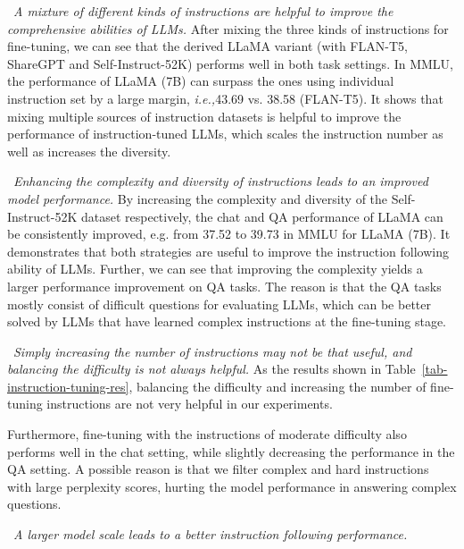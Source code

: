\textbullet~\emph{A mixture of different kinds of instructions are helpful to improve the comprehensive abilities of LLMs.} After mixing the three kinds of instructions for fine-tuning, we can see that the derived LLaMA variant (with FLAN-T5, ShareGPT and Self-Instruct-52K) performs well in both task settings. In MMLU, the performance of LLaMA (7B) can surpass the ones using individual instruction set by a large margin, \emph{i.e.,}43.69 vs. 38.58 (FLAN-T5). It shows that mixing multiple sources of instruction datasets is  helpful to improve the performance of instruction-tuned LLMs, which  scales the instruction number as well as increases the  diversity. 

\textbullet~\emph{Enhancing the complexity and diversity of instructions leads to an improved model  performance.} By increasing the  complexity and diversity of  the Self-Instruct-52K dataset respectively, the chat and QA performance of LLaMA can be consistently improved, {e.g. from 37.52 to 39.73 in MMLU for LLaMA (7B)}. It demonstrates that both strategies are useful to improve the instruction following ability of LLMs. Further, we can see that improving the complexity yields a larger performance improvement  on QA tasks. The reason is that the QA tasks mostly consist of difficult questions for evaluating LLMs, which can be better solved by LLMs that have learned complex instructions at the fine-tuning stage.

\textbullet~{\emph{Simply increasing the number of instructions may not be that useful, and balancing the difficulty is not always helpful.}} As the results shown in Table~\ref{tab-instruction-tuning-res}, balancing the difficulty and increasing the number of fine-tuning  instructions are not very helpful in our experiments. 

Furthermore, fine-tuning with  the instructions of moderate difficulty also performs well in the chat setting, while slightly decreasing the performance in the QA setting. A possible reason is that we filter complex and hard instructions with large perplexity scores, hurting the model performance in answering  complex questions.

\textbullet~{\emph{A larger model scale  leads to a better  instruction following performance.}}

\begin{center}
\begin{tcolorbox}[colback=blue!5!white,colframe=blue!55!black,width=0.48\textwidth,title={Instruction Tuning Suggestions}]

\end{tcolorbox}
\end{center}

